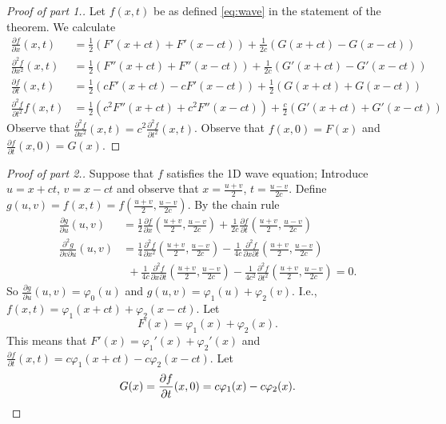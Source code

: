 \begin{proof}[Proof of part 1.]
    Let \(f(x,t)\) be as defined \eqref{eq:wave} in the statement of the theorem.
    We calculate
    \[
        \begin{aligned}
            \tfrac{\partial f}{\partial x} (x,t)
             & = \tfrac{1}{2} \left(F'(x+ct) + F'(x-ct)\right)
            + \tfrac{1}{2c}\left(G(x+ct) - G(x-ct)\right)               \\
            \tfrac{\partial^2 f}{\partial x^2}(x,t)
             & = \tfrac{1}{2} \left(F''(x+ct) + F''(x-ct)\right)
            + \tfrac{1}{2c}\left(G'(x+ct) - G'(x-ct)\right)             \\
            \tfrac{\partial f}{\partial t} (x,t)
             & = \tfrac{1}{2} \left(cF'(x+ct) - c F'(x-ct)\right)
            + \tfrac{1}{2}\left(G(x+ct) + G(x-ct)\right)                \\
            \tfrac{\partial^2 f}{\partial t^2} f(x,t)
             & = \tfrac{1}{2} \left(c^2F''(x+ct) + c^2 F''(x-ct)\right)
            + \tfrac{c}{2}\left(G'(x+ct) + G'(x-ct)\right)
        \end{aligned}
    \]
    Observe that  \(   \frac{\partial^2 f}{\partial x^2}(x,t) = c^2  \frac{\partial^2 f}{\partial t^2}(x,t) \).
    Observe that \(f(x,0) = F(x)\)
    and \(\frac{\partial f}{\partial t}(x,0) = G(x)\).
\end{proof}

\begin{proof}[Proof of part 2.]
    Suppose that \(f\) satisfies the 1D wave equation;
    Introduce \(u = x + ct\), \(v=x-ct\)
    and observe that \(x = \frac{u+v}{2}\), \(t=\frac{u-v}{2c}\).
    Define \(g(u,v) = f(x,t) = f(   \frac{u+v}{2} , \frac{u-v}{2c} )\).
    By the chain rule
    \[
        \begin{aligned}
            \tfrac{\partial g}{\partial u}(u,v)
             & = \tfrac{1}{2} \tfrac{\partial f}{\partial x}(   \tfrac{u+v}{2} , \tfrac{u-v}{2c} )
            + \tfrac{1}{2c} \tfrac{\partial f}{\partial t}(   \tfrac{u+v}{2} , \tfrac{u-v}{2c} )                      \\
            \tfrac{\partial^2 g}{\partial v \partial u}(u,v)
             & = \tfrac{1}{4} \tfrac{\partial^2 f}{\partial x^2}(   \tfrac{u+v}{2} , \tfrac{u-v}{2c} )
            - \tfrac{1}{4c} \tfrac{\partial^2 f}{\partial x\partial t}(   \tfrac{u+v}{2} , \tfrac{u-v}{2c} )          \\
             & \ \ +  \tfrac{1}{4c} \tfrac{\partial^2 f}{\partial x \partial t}(   \tfrac{u+v}{2} , \tfrac{u-v}{2c} )
            -  \tfrac{1}{4c^2} \tfrac{\partial^2 f}{\partial t^2}(   \tfrac{u+v}{2} , \tfrac{u-v}{2c} ) = 0.
        \end{aligned}
    \]
    So \( \tfrac{\partial g}{\partial u}(u,v) = \varphi_0(u)\) and \(g(u,v) = \varphi_1(u) + \varphi_2(v)\).
    I.e., \(f(x,t) = \varphi_1(x+ct) + \varphi_2(x-ct)\).
    Let
    \[
        F(x) = \varphi_1(x) + \varphi_2(x).
    \]
    This means that
    \(F'(x) = \varphi_1'(x) + \varphi_2'(x)\)
    and \(\frac{\partial f}{\partial t}(x,t) = c\varphi_1(x+ct) - c\varphi_2(x-ct)\).
    Let
    \[
        G(x) = \frac{\partial f}{\partial t}(x,0) = c\varphi_1(x) - c\varphi_2(x). \qedhere
    \]
\end{proof}

